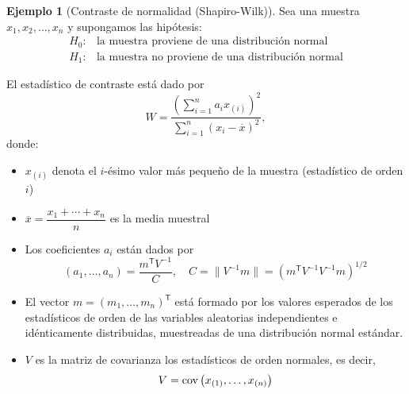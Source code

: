 \documentclass[11pt,a4paper]{book}
\theoremstyle{definition}%
\newtheorem{ejemplo}[teorema]{Ejemplo}
\begin{document}
            \begin{ejemplo}[Contraste de normalidad (Shapiro-Wilk)]
                Sea una muestra \(x_{1}, x_{2}, \ldots, x_{n}\) y supongamos las hipótesis:
                \[
                \begin{split}
                    H_{0}: &\text{la muestra proviene de una distribución normal}\\
                    H_{1}: &\text{la muestra no proviene de una distribución normal}
                \end{split}
                \]
                
                El estadístico de contraste está dado por
                    \begin{equation*}
                        W = \frac{\left( \sum_{i=1}^{n} a_i x_{(i)} \right)^{2}}{\sum_{i=1}^{n} (x_i - \overline{x})^{2}},
                    \end{equation*}
                    donde:
                    \begin{itemize}
                        \item $x_{(i)}$  denota el $i$-ésimo valor más pequeño de la muestra (estadístico de orden $i$)
                        
                        \item $\overline{x} = \dfrac{x_{1}+\cdots+x_{n}}{n}$ es la media muestral
                        
                        \item Los coeficientes $a_i$ están dados por
                        \[
                            (a_{1},\dots,a_{n}) = \frac{m^{\mathsf{T}} V^{-1}}{C}, \quad
                            C = \| V^{-1} m \| = \left( m^{\mathsf{T}} V^{-1} V^{-1} m \right)^{1/2}
                        \]
                        
                        \item El vector $m = (m_{1},\dots,m_{n})^{\mathsf{T}}$ está formado por los valores esperados de los estadísticos de orden 
                        de las variables aleatorias independientes e idénticamente distribuidas, muestreadas de una distribución normal estándar.
                        
                        \item $V$ es la matriz de covarianza los estadísticos de orden normales, es decir, $$V=\textup{cov}\left(x_{(1)},\dots,x_{(n)}\right)$$
                    \end{itemize}
            \end{ejemplo}
\end{document}

